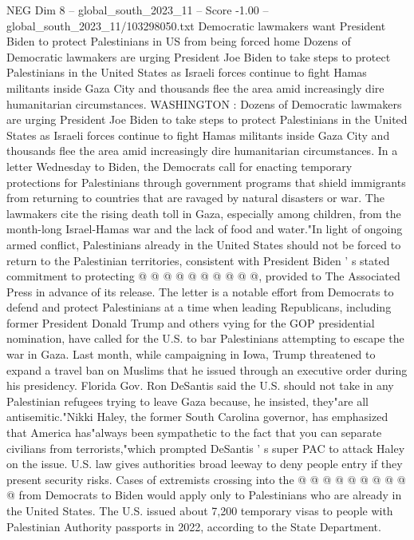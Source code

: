 \begin{textsample}{NEG Dim 8 – global\_south\_2023\_11 – Score -1.00 – global\_south\_2023\_11/103298050.txt}  \label{ex:f8_neg_081}
Democratic lawmakers want President Biden to protect Palestinians in US from being forced home Dozens of Democratic lawmakers are urging President Joe Biden to take steps to protect Palestinians in the United States as Israeli forces continue to fight Hamas militants inside Gaza City and thousands flee the area amid increasingly dire humanitarian circumstances.
WASHINGTON : Dozens of Democratic lawmakers are urging President Joe Biden to take steps to protect Palestinians in the United States as Israeli forces continue to fight Hamas militants inside Gaza City and thousands flee the area amid increasingly dire humanitarian circumstances.
In a letter Wednesday to Biden, the Democrats call for enacting temporary protections for Palestinians through government programs that shield immigrants from returning to countries that are ravaged by natural disasters or war.
The lawmakers cite the rising death toll in Gaza, especially among children, from the month-long Israel-Hamas war and the lack of food and water."In light of ongoing armed conflict, Palestinians already in the United States should not be forced to return to the Palestinian territories, consistent with President Biden ' s stated commitment to protecting @ @ @ @ @ @ @ @ @ @, provided to The Associated Press in advance of its release.
The letter is a notable effort from Democrats to defend and protect Palestinians at a time when leading Republicans, including former President Donald Trump and others vying for the GOP presidential nomination, have called for the U.S. to bar Palestinians attempting to escape the war in Gaza.
Last month, while campaigning in Iowa, Trump threatened to expand a travel ban on Muslims that he issued through an executive order during his presidency.
Florida Gov.
Ron DeSantis said the U.S. should not take in any Palestinian refugees trying to leave Gaza because, he insisted, they"are all antisemitic."Nikki Haley, the former South Carolina governor, has emphasized that America has"always been sympathetic to the fact that you can separate civilians from terrorists,"which prompted DeSantis ' s super PAC to attack Haley on the issue.
U.S. law gives authorities broad leeway to deny people entry if they present security risks.
Cases of extremists crossing into the @ @ @ @ @ @ @ @ @ @ from Democrats to Biden would apply only to Palestinians who are already in the United States.
The U.S. issued about 7,200 temporary visas to people with Palestinian Authority passports in 2022, according to the State Department.

\end{textsample}
